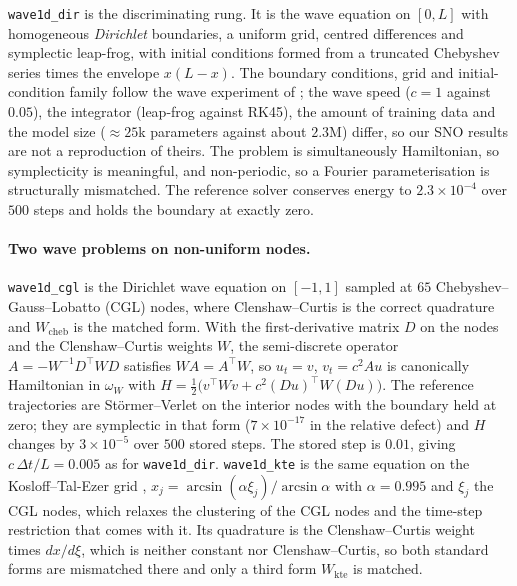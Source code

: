 \documentclass[11pt]{article}
\theoremstyle{definition}
\theoremstyle{remark}
\newcommand{\Wc}{W_{\mathrm{cheb}}}
\begin{document}
\texttt{wave1d\_dir} is the discriminating rung. It is the wave equation on
$[0,L]$ with homogeneous \emph{Dirichlet} boundaries, a uniform grid, centred
differences and symplectic leap-frog, with initial conditions formed from a
truncated Chebyshev series times the envelope $x(L-x)$. The boundary conditions,
grid and initial-condition family follow the wave experiment of
\citet{makara2026sno}; the wave speed ($c=1$ against $0.05$), the integrator
(leap-frog against RK45), the amount of training data and the model size
($\approx25$k parameters against about $2.3$M) differ, so our SNO results are not
a reproduction of theirs. The problem is simultaneously Hamiltonian, so
symplecticity is meaningful, and non-periodic, so a Fourier parameterisation is
structurally mismatched. The reference solver conserves energy to
$2.3\times10^{-4}$ over $500$ steps and holds the boundary at exactly zero.

\paragraph{Two wave problems on non-uniform nodes.} \texttt{wave1d\_cgl} is the
Dirichlet wave equation on $[-1,1]$ sampled at $65$ Chebyshev--Gauss--Lobatto
(CGL) nodes, where Clenshaw--Curtis is the correct quadrature and $\Wc$ is the
matched form. With the first-derivative matrix $D$ on the nodes and the
Clenshaw--Curtis weights $W$, the semi-discrete operator $A=-W^{-1}D^{\top}WD$
satisfies $WA=A^{\top}W$, so $u_t=v$, $v_t=c^2Au$ is canonically Hamiltonian in
$\omega_W$ with $H=\tfrac12\big(v^{\top}Wv+c^2(Du)^{\top}W(Du)\big)$. The
reference trajectories are St\"ormer--Verlet on the interior nodes with the
boundary held at zero; they are symplectic in that form ($7\times10^{-17}$ in the
relative defect) and $H$ changes by $3\times10^{-5}$ over $500$ stored steps. The
stored step is $0.01$, giving $c\,\Delta t/L=0.005$ as for \texttt{wave1d\_dir}.
\texttt{wave1d\_kte} is the same equation on the Kosloff--Tal-Ezer grid
\citep{kosloff1993}, $x_j=\arcsin(\alpha\xi_j)/\arcsin\alpha$ with $\alpha=0.995$
and $\xi_j$ the CGL nodes, which relaxes the clustering of the CGL nodes and the
time-step restriction that comes with it. Its quadrature is the Clenshaw--Curtis
weight times $dx/d\xi$, which is neither constant nor Clenshaw--Curtis, so both
standard forms are mismatched there and only a third form $W_{\mathrm{kte}}$ is
matched.
\end{document}
